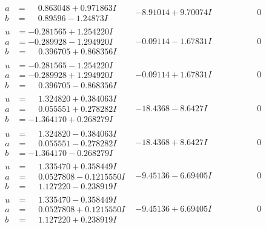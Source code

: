 \documentclass[1p]{elsarticle_modified}
\theoremstyle{definition}
\begin{document}
$$\begin{array}{c|c|c}
\begin{aligned}
a &= \phantom{-}0.863048 + 0.971863 I \\
b &= \phantom{-}0.89596 - 1.24873 I\end{aligned}
 & -8.91014 + 9.70074 I & \phantom{-0.000000 } 0 \\ \hline\begin{aligned}
u &= -0.281565 + 1.254220 I \\
a &= -0.289928 - 1.294920 I \\
b &= \phantom{-}0.396705 + 0.868356 I\end{aligned}
 & -0.09114 - 1.67831 I & \phantom{-0.000000 } 0 \\ \hline\begin{aligned}
u &= -0.281565 - 1.254220 I \\
a &= -0.289928 + 1.294920 I \\
b &= \phantom{-}0.396705 - 0.868356 I\end{aligned}
 & -0.09114 + 1.67831 I & \phantom{-0.000000 } 0 \\ \hline\begin{aligned}
u &= \phantom{-}1.324820 + 0.384063 I \\
a &= \phantom{-}0.055551 + 0.278282 I \\
b &= -1.364170 + 0.268279 I\end{aligned}
 & -18.4368 - 8.6427 I & \phantom{-0.000000 } 0 \\ \hline\begin{aligned}
u &= \phantom{-}1.324820 - 0.384063 I \\
a &= \phantom{-}0.055551 - 0.278282 I \\
b &= -1.364170 - 0.268279 I\end{aligned}
 & -18.4368 + 8.6427 I & \phantom{-0.000000 } 0 \\ \hline\begin{aligned}
u &= \phantom{-}1.335470 + 0.358449 I \\
a &= \phantom{-}0.0527808 - 0.1215550 I \\
b &= \phantom{-}1.127220 - 0.238919 I\end{aligned}
 & -9.45136 - 6.69405 I & \phantom{-0.000000 } 0 \\ \hline\begin{aligned}
u &= \phantom{-}1.335470 - 0.358449 I \\
a &= \phantom{-}0.0527808 + 0.1215550 I \\
b &= \phantom{-}1.127220 + 0.238919 I\end{aligned}
 & -9.45136 + 6.69405 I & \phantom{-0.000000 } 0 \\ \hline\begin{aligned}

\end{aligned}
\end{array}$$
\end{document}
